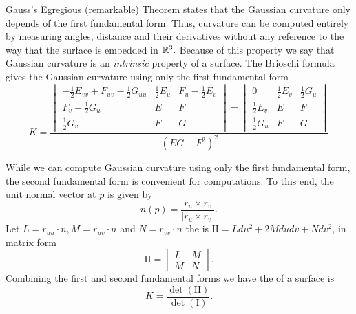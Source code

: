 Gauss's Egregious (remarkable) Theorem states that the Gaussian curvature only depends
of the first fundamental form. Thus, curvature can be computed entirely by measuring angles, distance 
and their derivatives without any reference to the way that the surface is embedded in $\mathbb{R}^3.$
Because of this property we say that Gaussian curvature is an \emph{intrinsic} property of a surface.
The Brioschi formula gives the Gaussian curvature using only the first fundamental form
\begin{equation}\label{eq:brioschi}
	K=\frac{\begin{vmatrix}
-\frac{1}{2}E_{vv}+F_{uv}-\frac{1}{2}G_{uu} & \frac{1}{2}E_u & F_u-\frac{1}{2}E_v\\
F_v-\frac{1}{2}G_u & E & F\\
\frac{1}{2}G_v & F & G
\end{vmatrix}-\begin{vmatrix}
0 & \frac{1}{2}E_v & \frac{1}{2}G_u\\
\frac{1}{2}E_v & E & F\\
\frac{1}{2}G_u & F & G
\end{vmatrix}}{(EG-F^2)^2}
\end{equation}



While we can compute Gaussian curvature using only the first fundamental form,
 the second fundamental form is convenient for computations.
To this end, the unit normal vector at $p$ is given by $$n(p)=\frac{r_u\times r_v}{|r_u\times r_v|}.$$
Let $L=r_{uu}\cdot n, M=r_{uv}\cdot n$ and $N=r_{vv}\cdot n$ the
 is $\mathrm{I\!I}=Ldu^2+2Mdudv+Ndv^2$,
in matrix form $$\mathrm{I\!I}=\begin{bmatrix}
L & M \\
M & N 
\end{bmatrix}.$$
Combining the first and second fundamental forms we have
the  of a surface is
\begin{equation}\label{eqn:curve-dets}
 	K=\frac{\det(\mathrm{I\!I})}{\det(\mathrm{I})}.
\end{equation}

